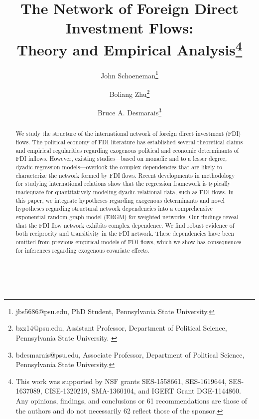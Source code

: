 \documentclass{article}
\begin{document}
\title{The Network of Foreign Direct Investment Flows: \\Theory and Empirical Analysis\footnote{This work was supported by NSF grants SES-1558661, SES-1619644, SES-1637089, CISE-1320219, SMA-1360104, and IGERT Grant DGE-1144860. Any opinions, findings, and conclusions or 61 recommendations are those of the authors and do not necessarily 62 reflect those of the sponsor.}}
\author{John  Schoeneman\thanks{\footnotesize{
jbs5686@psu.edu, PhD Student, Pennsylvania State University.}} \and Boliang Zhu\thanks{\footnotesize{bxz14@psu.edu, Assistant Professor, Department of Political Science, Pennsylvania State University. }} \and Bruce A. Desmarais\thanks{\footnotesize{
bdesmarais@psu.edu, Associate Professor, Department of Political Science, Pennsylvania State University.}}}
\date{}
\maketitle

\singlespacing
\begin{abstract}
    \noindent We study the structure of the international network of foreign direct investment (FDI) flows. The political economy of FDI literature has established several theoretical claims and empirical regularities regarding exogenous political and economic determinants of FDI inflows. %
    However, existing studies---based on monadic and to a lesser degree, dyadic regression models---overlook the complex dependencies that are likely to characterize the network formed by FDI flows. Recent developments in methodology for studying international relations show that the regression framework is typically inadequate for quantitatively modeling dyadic relational data, such as FDI flows. In this paper, we integrate hypotheses regarding exogenous determinants and novel hypotheses regarding structural network dependencies into a comprehensive exponential random graph model (ERGM) for weighted networks. Our findings reveal that the FDI flow network exhibits complex dependence. We find robust evidence of both reciprocity and transitivity in the FDI network. These dependencies have been omitted from previous empirical models of FDI flows, which we show has consequences for inferences regarding exogenous covariate effects.

\end{abstract}
~\\
\end{document}
